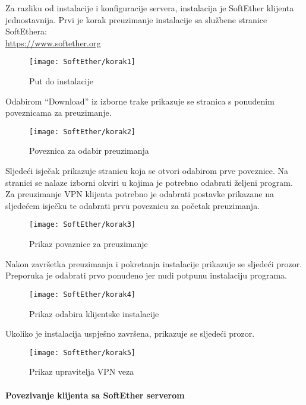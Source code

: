 \hfill \smallbreak
Za razliku od instalacije i konfiguracije servera, instalacija je SoftEther klijenta jednostavnija. Prvi je korak preuzimanje instalacije sa službene stranice SoftEthera:\\ \url{https://www.softether.org}
\begin{figure}[h!]
	\centering
     \texttt{[image: SoftEther/korak1]}
     	\caption{Put do instalacije}
\end{figure}
\FloatBarrier
Odabirom ``Download'' iz izborne trake prikazuje se stranica s ponuđenim poveznicama za preuzimanje.
\begin{figure}[h!]
     \centering
     \texttt{[image: SoftEther/korak2]}
     \caption{Poveznica za odabir preuzimanja}
\end{figure}
\FloatBarrier
Sljedeći isječak prikazuje stranicu koja se otvori odabirom prve poveznice. Na stranici se nalaze izborni okviri u kojima je potrebno odabrati željeni program. Za preuzimanje VPN klijenta potrebno je odabrati postavke prikazane na sljedećem isječku te odabrati prvu poveznicu za početak preuzimanja.
\begin{figure}[h!]
     \centering
     \texttt{[image: SoftEther/korak3]}
     \caption{Prikaz povaznice za preuzimanje}
\end{figure}
\FloatBarrier
Nakon završetka preuzimanja i pokretanja instalacije prikazuje se sljedeći prozor. Preporuka je odabrati prvo ponuđeno jer nudi potpunu instalaciju programa.
\begin{figure}[h!]
     \centering
     \texttt{[image: SoftEther/korak4]}
     \caption{Prikaz odabira klijentske instalacije}
\end{figure}
\FloatBarrier
Ukoliko je instalacija uspješno završena, prikazuje se sljedeći prozor.
\begin{figure}[h!]
     \centering
     \texttt{[image: SoftEther/korak5]}
     \caption{Prikaz upravitelja VPN veza}
\end{figure}
\FloatBarrier

\newpage
\paragraph*{Povezivanje klijenta sa SoftEther serverom}

